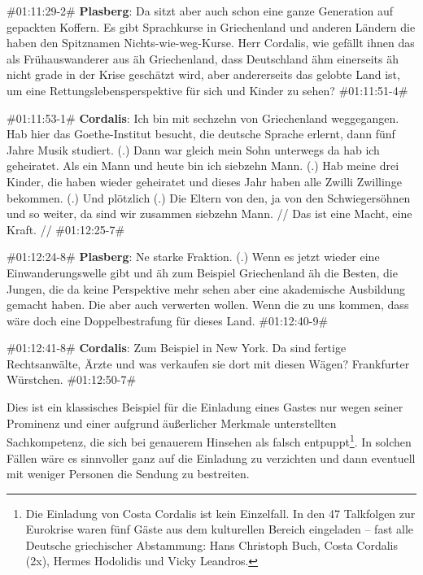 \begin{description}
	\begin{linenumbers}[1]
		\item \#01:11:29-2\# \textbf{Plasberg}: Da sitzt aber auch schon eine ganze Generation auf gepackten Koffern. Es gibt Sprachkurse in Griechenland und anderen Ländern die haben den Spitznamen Nichts-wie-weg-Kurse. Herr Cordalis, wie gefällt ihnen das als Frühauswanderer aus äh Griechenland, dass Deutschland ähm einerseits äh nicht grade in der Krise geschätzt wird, aber andererseits das gelobte Land ist, um eine Rettungslebensperspektive für sich und Kinder zu sehen? \#01:11:51-4\#
		
		\item \#01:11:53-1\# \textbf{Cordalis}: Ich bin mit sechzehn von Griechenland weggegangen. Hab hier das Goethe-Institut besucht, die deutsche Sprache erlernt, dann fünf Jahre Musik studiert. (.) Dann war gleich mein Sohn unterwegs da hab ich geheiratet. Als ein Mann und heute bin ich siebzehn Mann. (.) Hab meine drei Kinder, die haben wieder geheiratet und dieses Jahr haben alle Zwilli Zwillinge bekommen. (.) Und plötzlich (.) Die Eltern von den, ja von den Schwiegersöhnen und so weiter, da sind wir zusammen siebzehn Mann. // Das ist eine Macht, eine Kraft. //  \#01:12:25-7\#
		
		\item \#01:12:24-8\# \textbf{Plasberg}: Ne starke Fraktion. (.) Wenn es jetzt wieder eine Einwanderungswelle gibt und äh zum Beispiel Griechenland äh die Besten, die Jungen, die da keine Perspektive mehr sehen aber eine akademische Ausbildung gemacht haben. Die aber auch verwerten wollen. Wenn die zu uns kommen, dass wäre doch eine Doppelbestrafung für dieses Land.  \#01:12:40-9\#
		
		\item \#01:12:41-8\# \textbf{Cordalis}: Zum Beispiel in New York. Da sind fertige Rechtsanwälte, Ärzte und was verkaufen sie dort mit diesen Wägen? Frankfurter Würstchen. \#01:12:50-7\# 
	\end{linenumbers}
\end{description}

Dies ist ein klassisches Beispiel für die Einladung eines Gastes nur wegen seiner Prominenz und einer aufgrund äußerlicher Merkmale unterstellten Sachkompetenz, die sich bei genauerem Hinsehen als falsch entpuppt\footnote{Die Einladung von Costa Cordalis ist kein Einzelfall. In den 47 Talkfolgen zur Eurokrise waren fünf Gäste aus dem kulturellen Bereich eingeladen – fast alle Deutsche griechischer Abstammung: Hans Christoph Buch, Costa Cordalis (2x), Hermes Hodolidis und Vicky Leandros.}. In solchen Fällen wäre es sinnvoller ganz auf die Einladung zu verzichten und dann eventuell mit weniger Personen die Sendung zu bestreiten.

